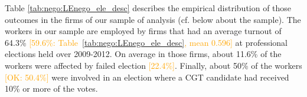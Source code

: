 Table \ref{tab:nego:LEnego_ele_desc} describes the empirical distribution of those outcomes in the firms of our sample of analysis (cf. below about the sample). The workers in our sample are employed by firms that had an average turnout of 64.3\% \textcolor{orange}{[59.6\%: Table~\ref{tab:nego:LEnego_ele_desc}, mean 0.596]} at professional elections held over 2009-2012. On average in those firms, about 11.6\% of the workers were affected by failed election \textcolor{orange}{[22.4\%]}. Finally, about 50\% of the workers \textcolor{orange}{[OK: 50.4\%]} were involved in an election where a CGT candidate had received 10\% or more of the votes.








